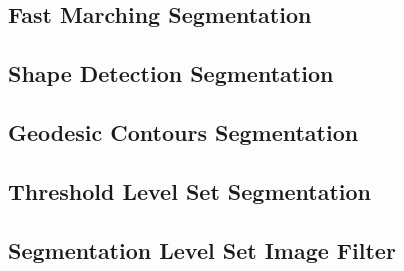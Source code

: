 %
%
% 
%
%
%




\subsection{Fast Marching Segmentation}
\label{sec:FastMarchingImageFilter}

\ifitkFullVersion

\fi



\subsection{Shape Detection Segmentation}

\subsection{Geodesic Contours Segmentation}

\subsection{Threshold Level Set Segmentation}

\subsection{Segmentation Level Set Image Filter}
\label{sec:SegmentationLevelSetImageFilter}


